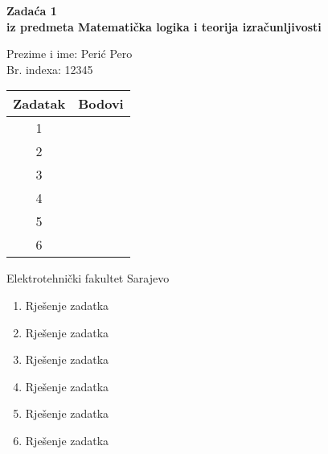 \documentclass[12pt]{article}
\newcommand{\prezimeIme}{Perić Pero}
\newcommand{\brIndexa}{12345}
\newcommand{\brZadace}{1}
\begin{document}
    
    \thispagestyle{empty}
    \begin{center}
      \vspace*{1cm}

      \vspace*{2cm}
      {\huge \bf Zadaća \brZadace } \\
      \vspace*{1cm}
      {\Large \bf iz predmeta Matematička logika i teorija izračunljivosti}

      \vspace*{2cm}

      {\Large Prezime i ime: \prezimeIme} \\
      \vspace*{0.75cm}
      {\Large Br. indexa: \brIndexa}

      \vspace*{3cm}
      \renewcommand{\arraystretch}{1.75}
      \begin{tabular}{|c|c|}
    	\hline Zadatak & Bodovi \\
    	\hline 1 &  \\
    	\hline 2 &  \\
    	\hline 3 &  \\
    	\hline 4 &  \\
    	\hline 5 &  \\
    	\hline 6 &  \\
    	\hline
     \end{tabular}

      \vfill


      {\large Elektrotehnički fakultet Sarajevo}

    \end{center}
    \newpage
    \thispagestyle{empty}
    
    
	\begin{enumerate}
		\item Rješenje zadatka
		
		\item Rješenje zadatka
		
		\item Rješenje zadatka
		
		\item Rješenje zadatka
		
		\item Rješenje zadatka
		
		\item Rješenje zadatka
		
	\end{enumerate}
	
	
	
    
\end{document}
